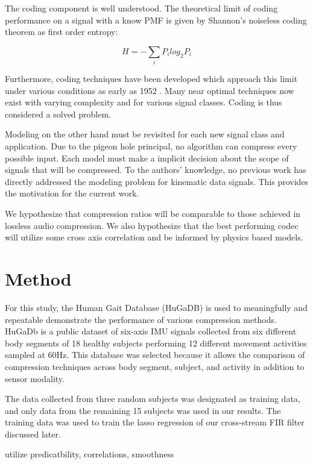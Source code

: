 \documentclass[journal]{IEEEtran}
\begin{document}
The coding component is well understood. The theoretical limit of coding performance on a signal with a know PMF is given by Shannon's noiseless coding theorem\cite{Shannon1948} as first order entropy:

$$H = -\sum_{i} P_ilog_2P_i$$

Furthermore, coding techniques have been developed which approach this limit under various conditions as early as 1952 \cite{Huffman1952}. Many near optimal techniques now exist with varying complexity and for various signal classes. Coding is thus considered a solved problem.

Modeling on the other hand must be revisited for each new signal class and application. Due to the pigeon hole principal, no algorithm can compress every possible input. Each model must make a implicit decision about the scope of signals that will be compressed. To the authors' knowledge, no previous work has directly addressed the modeling problem for kinematic data signals. This provides the motivation for the current work.

We hypothesize that compression ratios will be comparable to those achieved in lossless audio compression. We also hypothesize that the best performing codec will utilize some cross axis correlation and be informed by physics based models.

\section{Method}
For this study, the Human Gait Database (HuGaDB)\cite{Chereshnev2018} is used to meaningfully and repeatable demonstrate the performance of various compression methods. HuGaDb is a public dataset of six-axis IMU signals collected from six different body segments of 18 healthy subjects performing 12 different movement activities sampled at 60Hz. This database was selected because it allows the comparison of compression techniques across body segment, subject, and activity in addition to sensor modality.

The data collected from three random subjects was designated as training data, and only data from the remaining 15 subjects was used in our results. The training data was used to train the lasso regression of our cross-stream FIR filter discussed later.

utilize predicatbility, correlations, smoothness
\end{document}
